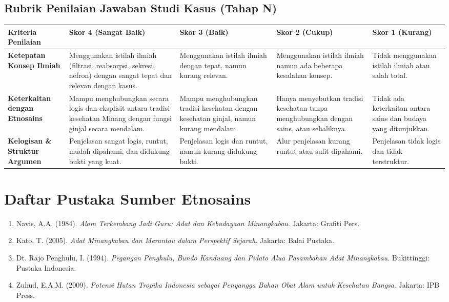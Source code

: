 \documentclass[a4paper,12pt]{article}
\begin{document}
\subsection{Rubrik Penilaian Jawaban Studi Kasus (Tahap N)}

\begin{longtable}{|p{3cm}|p{3cm}|p{3cm}|p{3cm}|p{3cm}|}
\hline
\textbf{Kriteria Penilaian} & \textbf{Skor 4 (Sangat Baik)} & \textbf{Skor 3 (Baik)} & \textbf{Skor 2 (Cukup)} & \textbf{Skor 1 (Kurang)} \\
\hline
\textbf{Ketepatan Konsep Ilmiah} & Menggunakan istilah ilmiah (filtrasi, reabsorpsi, sekresi, nefron) dengan sangat tepat dan relevan dengan kasus. & Menggunakan istilah ilmiah dengan tepat, namun kurang relevan. & Menggunakan istilah ilmiah namun ada beberapa kesalahan konsep. & Tidak menggunakan istilah ilmiah atau salah total. \\
\hline
\textbf{Keterkaitan dengan Etnosains} & Mampu menghubungkan secara logis dan eksplisit antara tradisi kesehatan Minang dengan fungsi ginjal secara mendalam. & Mampu menghubungkan tradisi kesehatan dengan kesehatan ginjal, namun kurang mendalam. & Hanya menyebutkan tradisi kesehatan tanpa menghubungkan dengan sains, atau sebaliknya. & Tidak ada keterkaitan antara sains dan budaya yang ditunjukkan. \\
\hline
\textbf{Kelogisan \& Struktur Argumen} & Penjelasan sangat logis, runtut, mudah dipahami, dan didukung bukti yang kuat. & Penjelasan logis dan runtut, namun kurang didukung bukti. & Alur penjelasan kurang runtut atau sulit dipahami. & Penjelasan tidak logis dan tidak terstruktur. \\
\hline
\end{longtable}

\section{Daftar Pustaka Sumber Etnosains}

\begin{enumerate}
\item Navis, A.A. (1984). \textit{Alam Terkembang Jadi Guru: Adat dan Kebudayaan Minangkabau}. Jakarta: Grafiti Pers.
\item Kato, T. (2005). \textit{Adat Minangkabau dan Merantau dalam Perspektif Sejarah}. Jakarta: Balai Pustaka.
\item Dt. Rajo Penghulu, I. (1994). \textit{Pegangan Penghulu, Bundo Kanduang dan Pidato Alua Pasambahan Adat Minangkabau}. Bukittinggi: Pustaka Indonesia.
\item Zuhud, E.A.M. (2009). \textit{Potensi Hutan Tropika Indonesia sebagai Penyangga Bahan Obat Alam untuk Kesehatan Bangsa}. Jakarta: IPB Press.
\end{enumerate}
\end{document}
